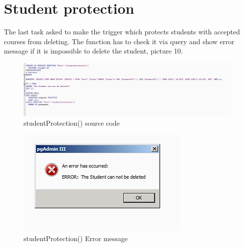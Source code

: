 \documentclass[english]{article}
\begin{document}
\section{Student protection}
The last task asked to make the trigger which protects students with accepted courses from deleting. The function has to check it via query and show error message if it is impossible to delete the student, picture 10.
\begin{figure}[h!]
\centerline{\includegraphics[scale=0.7]{PLPGSQL/studentProtectionSource}}
\caption{studentProtection() source code}
\end{figure}
\begin{figure}[h!]
\centerline{\includegraphics[scale=0.9]{PLPGSQL/errorDeleting}}
\caption{studentProtection() Error message}
\end{figure}
\end{document}
